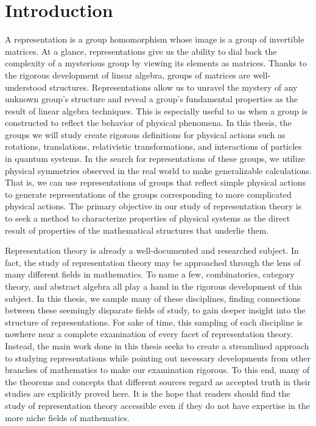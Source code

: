 \chapter{Introduction}

A representation is a group homomorphism whose image is a group of invertible matrices. At a glance, representations give us the ability to dial back the complexity of a mysterious group by viewing its elements as matrices. Thanks to the rigorous development of linear algebra, groups of matrices are well-understood structures. Representations allow us to unravel the mystery of any unknown group's structure and reveal a group’s fundamental properties as the result of linear algebra techniques. This is especially useful to us when a group is constructed to reflect the behavior of physical phenomena. In this thesis, the groups we will study create rigorous definitions for physical actions such as rotations, translations, relativistic transformations, and interactions of particles in quantum systems. In the search for representations of these groups, we utilize physical symmetries observed in the real world to make generalizable calculations. That is, we can use representations of groups that reflect simple physical actions to generate representations of the groups corresponding to more complicated physical actions. The primary objective in our study of representation theory is to seek a method to characterize properties of physical systems as the direct result of properties of the mathematical structures that underlie them.

Representation theory is already a well-documented and researched subject. In fact, the study of representation theory may be approached through the lens of many different fields in mathematics. To name a few, combinatorics, category theory, and abstract algebra all play a hand in the rigorous development of this subject. In this thesis, we sample many of these disciplines, finding connections between these seemingly disparate fields of study, to gain deeper insight into the structure of representations. For sake of time, this sampling of each discipline is nowhere near a complete examination of every facet of representation theory. Instead, the main work done in this thesis seeks to create a streamlined approach to studying representations while pointing out necessary developments from other branches of mathematics to make our examination rigorous. To this end, many of the theorems and concepts that different sources regard as accepted truth in their studies are explicitly proved here. It is the hope that readers should find the study of representation theory accessible even if they do not have expertise in the more niche fields of mathematics.
